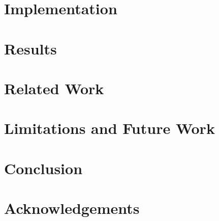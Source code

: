 \documentclass[conference]{IEEEtran}
\begin{document}
\section{Implementation}
\label{sec:implementation}


\section{Results}
\label{sec:results}


\section{Related Work}
\label{sec:relwork}



\section{Limitations and Future Work}
\label{sec:future}


\section{Conclusion}


\section{Acknowledgements}





\end{document}
